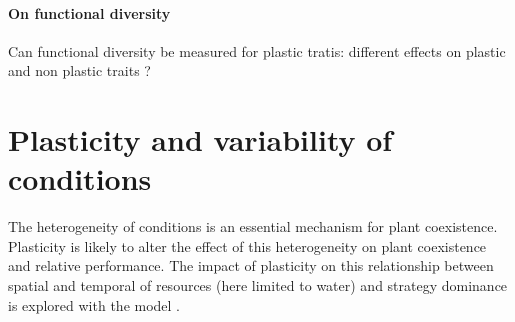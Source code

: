 


\paragraph{On functional diversity}

Can functional diversity be measured for plastic tratis: different effects on plastic and non plastic traits ?


%
%
%




\section{Plasticity and variability of conditions}
The heterogeneity of conditions is an essential mechanism for plant coexistence. Plasticity is likely to alter the effect of this heterogeneity on plant coexistence and relative performance. The impact of plasticity on this relationship between spatial and temporal  of resources (here limited to water) and strategy dominance is explored with the model \model.\\

